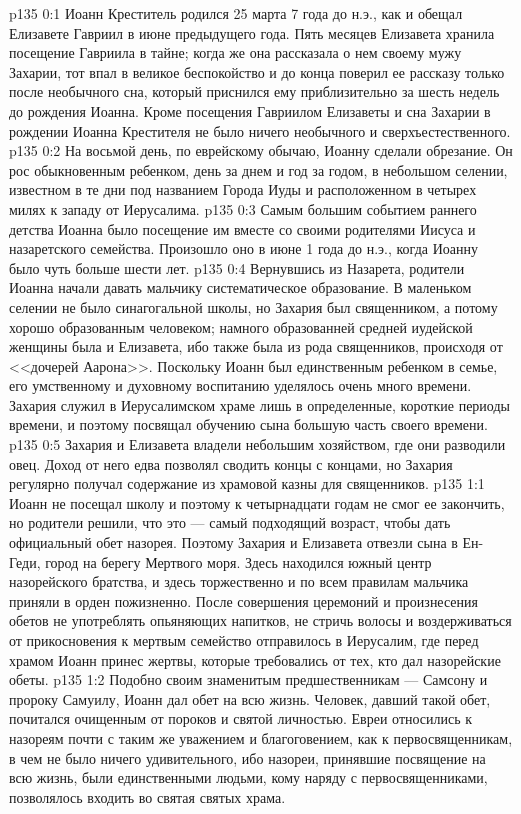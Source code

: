 \vs p135 0:1 Иоанн Креститель родился 25 марта 7 года до н.э., как и обещал Елизавете Гавриил в июне предыдущего года. Пять месяцев Елизавета хранила посещение Гавриила в тайне; когда же она рассказала о нем своему мужу Захарии, тот впал в великое беспокойство и до конца поверил ее рассказу только после необычного сна, который приснился ему приблизительно за шесть недель до рождения Иоанна. Кроме посещения Гавриилом Елизаветы и сна Захарии в рождении Иоанна Крестителя не было ничего необычного и сверхъестественного.
\vs p135 0:2 На восьмой день, по еврейскому обычаю, Иоанну сделали обрезание. Он рос обыкновенным ребенком, день за днем и год за годом, в небольшом селении, известном в те дни под названием Города Иуды и расположенном в четырех милях к западу от Иерусалима.
\vs p135 0:3 Самым большим событием раннего детства Иоанна было посещение им вместе со своими родителями Иисуса и назаретского семейства. Произошло оно в июне 1 года до н.э., когда Иоанну было чуть больше шести лет.
\vs p135 0:4 Вернувшись из Назарета, родители Иоанна начали давать мальчику систематическое образование. В маленьком селении не было синагогальной школы, но Захария был священником, а потому хорошо образованным человеком; намного образованней средней иудейской женщины была и Елизавета, ибо также была из рода священников, происходя от <<дочерей Аарона>>. Поскольку Иоанн был единственным ребенком в семье, его умственному и духовному воспитанию уделялось очень много времени. Захария служил в Иерусалимском храме лишь в определенные, короткие периоды времени, и поэтому посвящал обучению сына большую часть своего времени.
\vs p135 0:5 Захария и Елизавета владели небольшим хозяйством, где они разводили овец. Доход от него едва позволял сводить концы с концами, но Захария регулярно получал содержание из храмовой казны для священников.
\vs p135 1:1 Иоанн не посещал школу и поэтому к четырнадцати годам не смог ее закончить, но родители решили, что это --- самый подходящий возраст, чтобы дать официальный обет назорея. Поэтому Захария и Елизавета отвезли сына в Ен\hyp{}Геди, город на берегу Мертвого моря. Здесь находился южный центр назорейского братства, и здесь торжественно и по всем правилам мальчика приняли в орден пожизненно. После совершения церемоний и произнесения обетов не употреблять опьяняющих напитков, не стричь волосы и воздерживаться от прикосновения к мертвым семейство отправилось в Иерусалим, где перед храмом Иоанн принес жертвы, которые требовались от тех, кто дал назорейские обеты.
\vs p135 1:2 Подобно своим знаменитым предшественникам --- Самсону и пророку Самуилу, Иоанн дал обет на всю жизнь. Человек, давший такой обет, почитался очищенным от пороков и святой личностью. Евреи относились к назореям почти с таким же уважением и благоговением, как к первосвященникам, в чем не было ничего удивительного, ибо назореи, принявшие посвящение на всю жизнь, были единственными людьми, кому наряду с первосвященниками, позволялось входить во святая святых храма.
